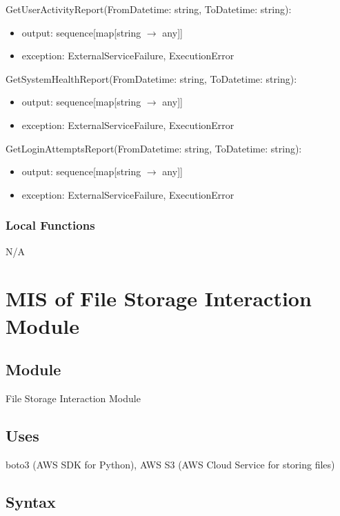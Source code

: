 \documentclass[12pt, titlepage]{article}
\begin{document}
\noindent GetUserActivityReport(FromDatetime: string, ToDatetime: string):
\begin{itemize}
  \item output: sequence[map[string $\rightarrow$ any]]
  \item exception: ExternalServiceFailure, ExecutionError
\end{itemize}

\noindent GetSystemHealthReport(FromDatetime: string, ToDatetime: string):
\begin{itemize}
  \item output: sequence[map[string $\rightarrow$ any]]
  \item exception: ExternalServiceFailure, ExecutionError
\end{itemize}

\noindent GetLoginAttemptsReport(FromDatetime: string, ToDatetime: string):
\begin{itemize}
  \item output: sequence[map[string $\rightarrow$ any]]
  \item exception: ExternalServiceFailure, ExecutionError
\end{itemize}

\subsubsection{Local Functions}

N/A

\section{MIS of File Storage Interaction Module} \label{Module}

\subsection{Module}

File Storage Interaction Module

\subsection{Uses}

boto3 (AWS SDK for Python), AWS S3 (AWS Cloud Service for storing files)

\subsection{Syntax}
\end{document}
